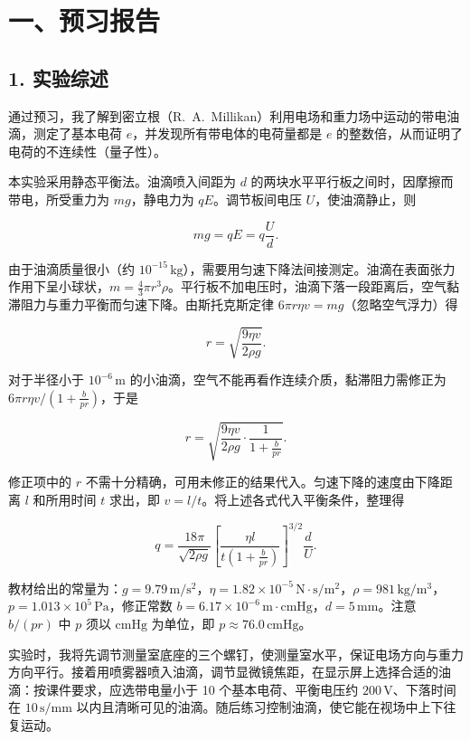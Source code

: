 \section*{一、预习报告}

\subsection*{1. 实验综述}

通过预习，我了解到密立根（R.~A.~Millikan）利用电场和重力场中运动的带电油滴，测定了基本电荷 $e$，并发现所有带电体的电荷量都是 $e$ 的整数倍，从而证明了电荷的不连续性（量子性）。

本实验采用静态平衡法。油滴喷入间距为 $d$ 的两块水平平行板之间时，因摩擦而带电，所受重力为 $mg$，静电力为 $qE$。调节板间电压 $U$，使油滴静止，则

\[
mg=qE=q\frac{U}{d}.
\]

由于油滴质量很小（约 $10^{-15}\,\mathrm{kg}$），需要用匀速下降法间接测定。油滴在表面张力作用下呈小球状，$m=\frac43\pi r^3\rho$。平行板不加电压时，油滴下落一段距离后，空气黏滞阻力与重力平衡而匀速下降。由斯托克斯定律 $6\pi r\eta v=mg$（忽略空气浮力）得

\[
r=\sqrt{\frac{9\eta v}{2\rho g}}.
\]

对于半径小于 $10^{-6}\,\mathrm{m}$ 的小油滴，空气不能再看作连续介质，黏滞阻力需修正为 $6\pi r\eta v/(1+\frac{b}{pr})$，于是

\[
r=\sqrt{\frac{9\eta v}{2\rho g}\cdot\frac{1}{1+\frac{b}{pr}}}.
\]

修正项中的 $r$ 不需十分精确，可用未修正的结果代入。匀速下降的速度由下降距离 $l$ 和所用时间 $t$ 求出，即 $v=l/t$。将上述各式代入平衡条件，整理得

\[
q=\frac{18\pi}{\sqrt{2\rho g}}\left[\frac{\eta l}{t\left(1+\frac{b}{pr}\right)}\right]^{3/2}\frac{d}{U}.
\]

教材给出的常量为：$g=9.79\,\mathrm{m/s^2}$，$\eta=1.82\times10^{-5}\,\mathrm{N\cdot s/m^2}$，$\rho=981\,\mathrm{kg/m^3}$，$p=1.013\times10^5\,\mathrm{Pa}$，修正常数 $b=6.17\times10^{-6}\,\mathrm{m\cdot cmHg}$，$d=5\,\mathrm{mm}$。注意 $b/(pr)$ 中 $p$ 须以 $\mathrm{cmHg}$ 为单位，即 $p\approx76.0\,\mathrm{cmHg}$。

实验时，我将先调节测量室底座的三个螺钉，使测量室水平，保证电场方向与重力方向平行。接着用喷雾器喷入油滴，调节显微镜焦距，在显示屏上选择合适的油滴：按课件要求，应选带电量小于 10 个基本电荷、平衡电压约 $200\,\mathrm{V}$、下落时间在 $10\,\mathrm{s/mm}$ 以内且清晰可见的油滴。随后练习控制油滴，使它能在视场中上下往复运动。

